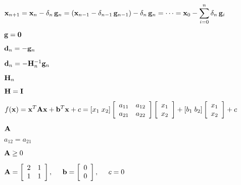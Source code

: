 \documentclass{article}
\def\lthtmlcheckvsize{\ifdim\ht\sizebox<\vsize 
  \ifdim\wd\sizebox<\hsize\expandafter\hfill\fi \expandafter\vfill
  \else\expandafter\vss\fi}%
\begin{document}
{\newpage\clearpage
{}%
$\displaystyle {\bf x}_{n+1}={\bf x}_n-\delta_n \, {\bf g}_n
=({\bf x}_{n-1}-\delta_{n-1}\,{\bf g}_{n-1})-\delta_n \, {\bf g}_n=\cdots=
{\bf x}_0-\sum_{i=0}^n \delta_n\,{\bf g}_i$%
\lthtmlindisplaymathZ
\lthtmlcheckvsize\clearpage}

{\newpage\clearpage
{}%
$ {\bf g}={\bf0}$%
\lthtmlindisplaymathZ
\lthtmlcheckvsize\clearpage}

{\newpage\clearpage
{}%
$ {\bf d}_n=-{\bf g}_n$%
\lthtmlindisplaymathZ
\lthtmlcheckvsize\clearpage}

{\newpage\clearpage
{}%
$ {\bf d}_n=-{\bf H}^{-1}_n{\bf g}_n$%
\lthtmlindisplaymathZ
\lthtmlcheckvsize\clearpage}

{\newpage\clearpage
{}%
$ {\bf H}_n$%
\lthtmlindisplaymathZ
\lthtmlcheckvsize\clearpage}

{\newpage\clearpage
{}%
$ {\bf H}={\bf I}$%
\lthtmlindisplaymathZ
\lthtmlcheckvsize\clearpage}

{\newpage\clearpage
{}%
$\displaystyle f({\bf x})={\bf x}^T{\bf Ax}+{\bf b}^T{\bf x}+c
=[x_1\;x_2]\left[\begin{array}{cc}a_{11} & a_{12}\\a_{21} & a_{22}\end{array}\right]
\left[\begin{array}{c}x_1\\x_2\end{array}\right]
+[b_1\;b_2]\left[\begin{array}{c}x_1\\x_2\end{array}\right]+c$%
\lthtmlindisplaymathZ
\lthtmlcheckvsize\clearpage}

{\newpage\clearpage
{}%
$ {\bf A}$%
\lthtmlindisplaymathZ
\lthtmlcheckvsize\clearpage}

{\newpage\clearpage
{}%
$ a_{12}=a_{21}$%
\lthtmlindisplaymathZ
\lthtmlcheckvsize\clearpage}

{\newpage\clearpage
{}%
$ {\bf A}\ge 0$%
\lthtmlindisplaymathZ
\lthtmlcheckvsize\clearpage}

{\newpage\clearpage
{}%
$\displaystyle {\bf A}=\left[\begin{array}{cc}2 & 1\\1 & 1\end{array}\right],\;\;\;\;\;
{\bf b}=\left[\begin{array}{c}0 \\0\end{array}\right],\;\;\;\;\;  c=0$%
\lthtmlindisplaymathZ
\lthtmlcheckvsize\clearpage}
\end{document}

